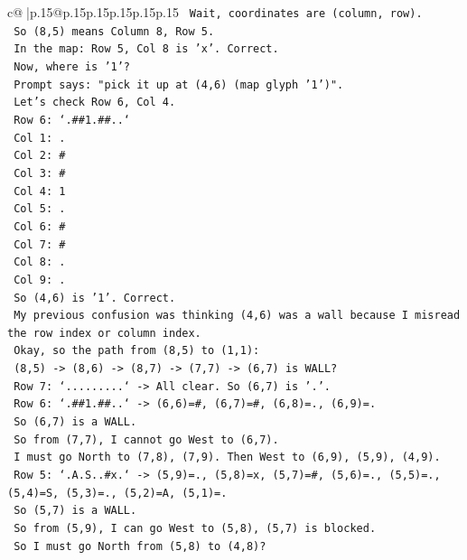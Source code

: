 \documentclass{article}
\begin{document}
{\begin{supertabular}{c@{$\;$}|p{.15\linewidth}@{}p{.15\linewidth}p{.15\linewidth}p{.15\linewidth}p{.15\linewidth}p{.15\linewidth}}
{{{\texttt{   Wait, coordinates are (column, row).} \\
\texttt{   So (8,5) means Column 8, Row 5.} \\
\texttt{   In the map: Row 5, Col 8 is 'x'. Correct.} \\
\texttt{   Now, where is '1'?} \\
\texttt{   Prompt says: "pick it up at (4,6) (map glyph '1')".} \\
\texttt{   Let's check Row 6, Col 4.} \\
\texttt{   Row 6: `.\#\#1.\#\#..`} \\
\texttt{   Col 1: .} \\
\texttt{   Col 2: \#} \\
\texttt{   Col 3: \#} \\
\texttt{   Col 4: 1} \\
\texttt{   Col 5: .} \\
\texttt{   Col 6: \#} \\
\texttt{   Col 7: \#} \\
\texttt{   Col 8: .} \\
\texttt{   Col 9: .} \\
\texttt{   So (4,6) is '1'. Correct.} \\
\texttt{   My previous confusion was thinking (4,6) was a wall because I misread the row index or column index.} \\
\texttt{   Okay, so the path from (8,5) to (1,1):} \\
\texttt{   (8,5) {-}> (8,6) {-}> (8,7) {-}> (7,7) {-}> (6,7) is WALL?} \\
\texttt{   Row 7: `.........` {-}> All clear. So (6,7) is '.'.} \\
\texttt{   Row 6: `.\#\#1.\#\#..` {-}> (6,6)=\#, (6,7)=\#, (6,8)=., (6,9)=.} \\
\texttt{   So (6,7) is a WALL.} \\
\texttt{   So from (7,7), I cannot go West to (6,7).} \\
\texttt{   I must go North to (7,8), (7,9). Then West to (6,9), (5,9), (4,9).} \\
\texttt{   Row 5: `.A.S..\#x.` {-}> (5,9)=., (5,8)=x, (5,7)=\#, (5,6)=., (5,5)=., (5,4)=S, (5,3)=., (5,2)=A, (5,1)=.} \\
\texttt{   So (5,7) is a WALL.} \\
\texttt{   So from (5,9), I can go West to (5,8), (5,7) is blocked.} \\
\texttt{   So I must go North from (5,8) to (4,8)?} \\
}}}
\end{supertabular}}
\end{document}

